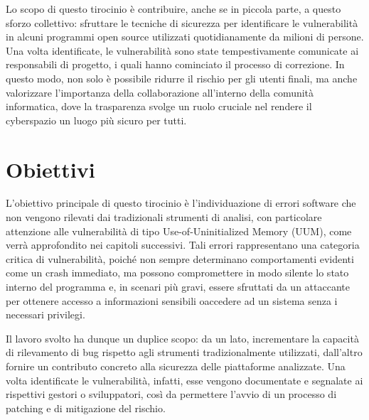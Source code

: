 Lo scopo di questo tirocinio è contribuire, anche se in piccola parte, a questo sforzo collettivo: sfruttare le tecniche di sicurezza per identificare le vulnerabilità in alcuni programmi open source utilizzati quotidianamente da milioni di persone. Una volta identificate, le vulnerabilità sono state tempestivamente comunicate ai responsabili di progetto, i quali hanno cominciato il processo di correzione. In questo modo, non solo è possibile ridurre il rischio per gli utenti finali, ma anche valorizzare l’importanza della collaborazione all’interno della comunità informatica, dove la trasparenza svolge un ruolo cruciale nel rendere il cyberspazio un luogo più sicuro per tutti.

\section{Obiettivi}

L’obiettivo principale di questo tirocinio è l’individuazione di errori software che non vengono rilevati dai tradizionali strumenti di analisi, con particolare attenzione alle vulnerabilità di tipo Use-of-Uninitialized Memory (UUM), come verrà approfondito nei capitoli successivi. Tali errori rappresentano una categoria critica di vulnerabilità, poiché non sempre determinano comportamenti evidenti come un crash immediato, ma possono compromettere in modo silente lo stato interno del programma e, in scenari più gravi, essere sfruttati da un attaccante per ottenere accesso a informazioni sensibili oaccedere ad un sistema senza i necessari privilegi.

Il lavoro svolto ha dunque un duplice scopo: da un lato, incrementare la capacità di rilevamento di bug rispetto agli strumenti tradizionalmente utilizzati, dall’altro fornire un contributo concreto alla sicurezza delle piattaforme analizzate. Una volta identificate le vulnerabilità, infatti, esse vengono documentate e segnalate ai rispettivi gestori o sviluppatori, così da permettere l’avvio di un processo di patching e di mitigazione del rischio.
